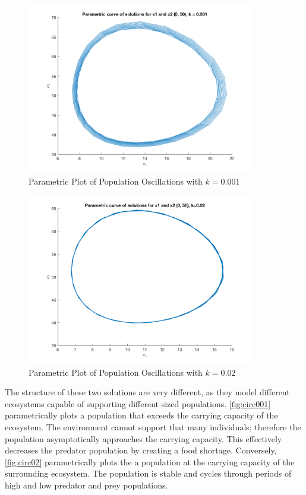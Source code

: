 \documentclass[12pt]{article}   %
\theoremstyle{definition}
\numberwithin{equation}{section}
\begin{document}
\begin{figure} [h] 
  \centering
  \includegraphics[width=10cm]{images/circ001.png}
  \caption{Parametric Plot of Population Oscillations with $k=0.001$}
  \label{fig:circ001}
\end{figure}

\begin{figure} [h] 
  \centering
    \includegraphics[width=10cm]{images/circ02.png}
  \caption{Parametric Plot of Population Oscillations with $k=0.02$}
  \label{fig:circ02}
\end{figure}


\quad The structure of these two solutions are very different, as they model different ecosystems capable of supporting different sized populations. \autoref{fig:circ001} parametrically plots a population that exceeds the carrying capacity of the ecosystem. The environment cannot support that many individuals; therefore the population asymptotically approaches the carrying capacity. This effectively decreases the predator population by creating a food shortage. Conversely, \autoref{fig:circ02} parametrically plots the a population at the carrying capacity of the surrounding ecosystem. The population is stable and cycles through periods of high and low predator and prey populations.     
\end{document}
